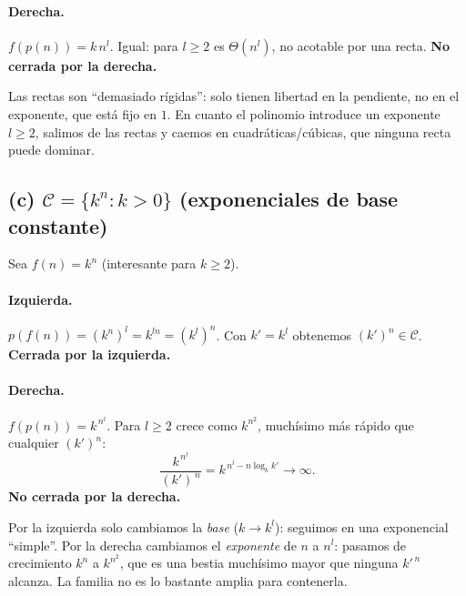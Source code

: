 \documentclass[11pt,a4paper]{article}
\theoremstyle{plain}
\theoremstyle{definition}
\begin{document}
\paragraph{Derecha.} $f(p(n)) = k\,n^{l}$. Igual: para $l\geq 2$ es $\Theta(n^{l})$,
no acotable por una recta. \textbf{No cerrada por la derecha.}
\medskip\noindent{}

\begin{porque}
Las rectas son ``demasiado r\'igidas'': solo tienen libertad en la pendiente, no en el
exponente, que est\'a fijo en $1$. En cuanto el polinomio introduce un exponente
$l\ge 2$, salimos de las rectas y caemos en cuadr\'aticas/c\'ubicas, que ninguna recta
puede dominar.
\end{porque}

\subsection*{(c) $\mathcal{C}=\{k^{n}: k>0\}$ (exponenciales de base constante)}

Sea $f(n)=k^{n}$ (interesante para $k\ge 2$).
\paragraph{Izquierda.} $p(f(n)) = (k^{n})^{l} = k^{ln} = (k^{l})^{n}$. Con
$k'=k^{l}$ obtenemos $(k')^{n}\in\mathcal{C}$. \textbf{Cerrada por la izquierda.}
\paragraph{Derecha.} $f(p(n)) = k^{\,n^{l}}$. Para $l\geq 2$ crece como $k^{n^2}$,
much\'isimo m\'as r\'apido que cualquier $(k')^{n}$:
\[
\frac{k^{\,n^{l}}}{(k')^{\,n}} = k^{\,n^{l}-n\log_k k'}\longrightarrow\infty .
\]
\textbf{No cerrada por la derecha.}
\medskip\noindent{}

\begin{porque}
Por la izquierda solo cambiamos la \emph{base} ($k\to k^l$): seguimos en una
exponencial ``simple''. Por la derecha cambiamos el \emph{exponente} de $n$ a $n^l$:
pasamos de crecimiento $k^n$ a $k^{n^2}$, que es una bestia much\'isimo mayor que
ninguna $k'^{\,n}$ alcanza. La familia no es lo bastante amplia para contenerla.
\end{porque}

\end{document}
